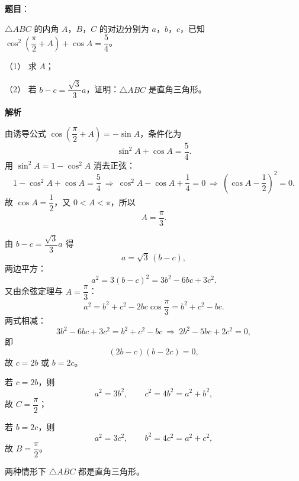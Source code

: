 \begin{answer}

\textbf{题目}：

$\triangle ABC$ 的内角 $A$，$B$，$C$ 的对边分别为 $a$，$b$，$c$，已知 $\cos^2\left(\dfrac\pi2+A\right)+\cos A=\dfrac54$。

（1） 求 $A$；

（2） 若 $b-c=\dfrac{\sqrt3}3a$，证明：$\triangle ABC$ 是直角三角形。

\textbf{解析}


由诱导公式 $\cos\left(\dfrac\pi2+A\right)=-\sin A$，条件化为
\nopagebreak[4]
\[\sin^2A+\cos A=\frac54 .\]
用 $\sin^2A=1-\cos^2A$ 消去正弦：
\nopagebreak[4]
\[1-\cos^2A+\cos A=\frac54\ \Longrightarrow\ \cos^2A-\cos A+\frac14=0\ \Longrightarrow\ \left(\cos A-\frac12\right)^2=0 .\]
故 $\cos A=\dfrac12$，又 $0<A<\pi$，所以
\nopagebreak[4]
\[A=\frac\pi3 .\]


由 $b-c=\dfrac{\sqrt3}3a$ 得
\nopagebreak[4]
\[a=\sqrt3\,(b-c),\]
两边平方：
\nopagebreak[4]
\[a^2=3(b-c)^2=3b^2-6bc+3c^2 .\]
又由余弦定理与 $A=\dfrac\pi3$：
\nopagebreak[4]
\[a^2=b^2+c^2-2bc\cos\frac\pi3=b^2+c^2-bc .\]
两式相减：
\nopagebreak[4]
\[3b^2-6bc+3c^2=b^2+c^2-bc\ \Longrightarrow\ 2b^2-5bc+2c^2=0,\]
即
\nopagebreak[4]
\[(2b-c)(b-2c)=0,\]
故 $c=2b$ 或 $b=2c$。

若 $c=2b$，则
\nopagebreak[4]
\[a^2=3b^2,\qquad c^2=4b^2=a^2+b^2,\]
故 $C=\dfrac\pi2$；

若 $b=2c$，则
\nopagebreak[4]
\[a^2=3c^2,\qquad b^2=4c^2=a^2+c^2,\]
故 $B=\dfrac\pi2$。

两种情形下 $\triangle ABC$ 都是直角三角形。



\end{answer}
